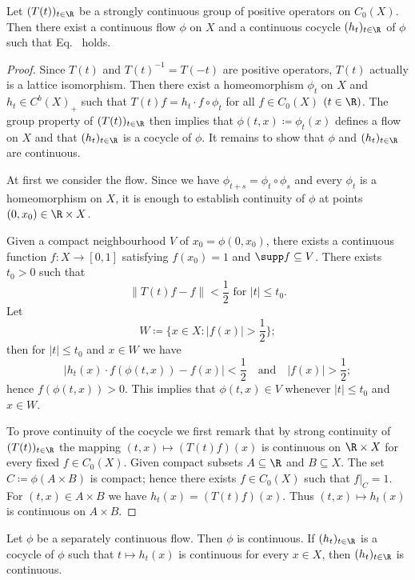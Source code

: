 \begin{proposition}\label{prop:b2-3.9}
Let $(T(t))_{t \in \R}$ be a strongly continuous group of positive operators on $C_0(X)$.
Then there exist a continuous flow $\phi$ on $X$ and a continuous cocycle $(h_t)_{t \in \R}$ of\/ $\phi$ such that Eq.~ holds.
\end{proposition}
\begin{proof}
Since $T(t)$ and $T(t)^{-1} = T(-t)$ are positive operators, $T(t)$ actually is a lattice isomorphism.
Then there exist a homeomorphism $\phi_t$ on $X$ and $h_t \in C^{b}(X)_+$ such that $T(t)f = h_t \cdot f \circ \phi_t$ for all $f \in C_0(X)$ $(t \in \R)$.
The group property of\/ $(T(t))_{t \in \R}$ then implies that $\phi(t,x) \coloneq \phi_t(x)$ defines a flow on $X$ and that $(h_t)_{t \in \R}$ is a cocycle of\/ $\phi$.
It remains to show that $\phi$ and $(h_t)_{t \in \R}$ are continuous.

At first we consider the flow.
Since we have $\phi_{t+s} = \phi_t \circ \phi_s$ and every $\phi_t$ is a homeomorphism on $X$, it is enough to establish continuity of\/ $\phi$ at points $(0,x_0) \in \R \times X$.

Given a compact neighbourhood $V$ of\/ $x_0 = \phi (0,x_0)$, there exists a continuous function $f \colon X \to [0,1]$ satisfying $f(x_0) = 1$ and $\supp f \subseteq V$.
There exists $t_0 > 0$ such that 
%
\[
	\|T(t)f - f\| < \frac{1}{2} \text{ for  $|t| \leq t_0$}.
\]
%
Let 
%
\[
	W \coloneq \{x \in X \colon |f(x)| > \frac{1}{2}\};
\]
%
then for $|t| \leq t_0$ and $x \in W$ we have 
%
\[
	|h_t(x) \cdot f(\phi(t,x)) - f(x)| < \frac{1}{2} \quad \text{and} \quad |f(x)| > \frac{1}{2};
\]
%
hence $f(\phi (t,x)) > 0$.
This implies that $\phi (t,x) \in V$ whenever $|t| \leq t_0$ and $x \in W$.

To prove continuity of the cocycle we first remark that by strong continuity of\/ $(T(t))_{t \in \R}$ 
the mapping $(t,x) \mapsto (T(t)f) (x)$ is continuous on $\R \times X$ for every fixed $f \in C_0(X)$.
Given compact subsets $A \subseteq \R $ and $B \subseteq X$.
The set $C \coloneq \phi(A \times B)$ is compact; hence there exists $f \in C_0(X)$ such that $f|_{C} = 1$.
For $(t,x) \in A \times B$ we have $h_t(x) = (T(t)f) (x)$.
Thus $(t,x) \mapsto h_t(x)$ is continuous on $A \times B$.
\end{proof}
\begin{corollary}\label{cor:b2-3.10}
Let $\phi$ be a separately continuous flow.
Then $\phi$ is continuous.
If\/ $(h_t)_{t \in \R}$ is a cocycle of\/ $\phi$ such that $t \mapsto h_t (x)$ is continuous for every $x \in X$, then $(h_t)_{t \in \R}$ is continuous.
\end{corollary}

